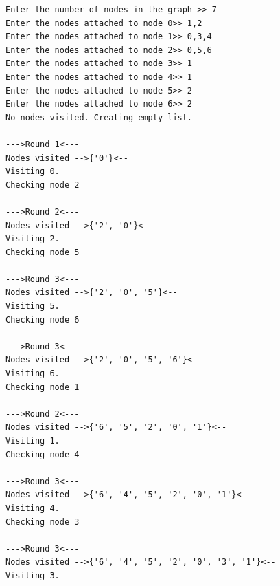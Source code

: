 \documentclass{article}
\begin{document}
\begin{lstlisting}
Enter the number of nodes in the graph >> 7
Enter the nodes attached to node 0>> 1,2
Enter the nodes attached to node 1>> 0,3,4
Enter the nodes attached to node 2>> 0,5,6
Enter the nodes attached to node 3>> 1
Enter the nodes attached to node 4>> 1
Enter the nodes attached to node 5>> 2
Enter the nodes attached to node 6>> 2
No nodes visited. Creating empty list. 

--->Round 1<---
Nodes visited -->{'0'}<--
Visiting 0.
Checking node 2

--->Round 2<---
Nodes visited -->{'2', '0'}<--
Visiting 2.
Checking node 5

--->Round 3<---
Nodes visited -->{'2', '0', '5'}<--
Visiting 5.
Checking node 6

--->Round 3<---
Nodes visited -->{'2', '0', '5', '6'}<--
Visiting 6.
Checking node 1

--->Round 2<---
Nodes visited -->{'6', '5', '2', '0', '1'}<--
Visiting 1.
Checking node 4

--->Round 3<---
Nodes visited -->{'6', '4', '5', '2', '0', '1'}<--
Visiting 4.
Checking node 3

--->Round 3<---
Nodes visited -->{'6', '4', '5', '2', '0', '3', '1'}<--
Visiting 3.


\end{lstlisting}
\end{document}
